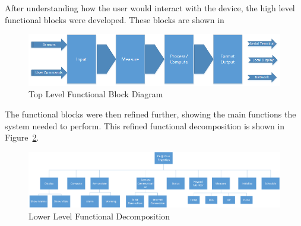 \documentclass[12pt]{article} %
\begin{document}
    After understanding how the user would interact with the device, the high level
    functional blocks were developed. These blocks are shown in


    \begin{figure}[h]
      \centering
      \includegraphics[width=\textwidth]{../design/top_level_function_block_diagram}
      \caption{Top Level Functional Block Diagram}
      \label{fig:func_top}
    \end{figure}

    The functional blocks were then refined further, showing the main functions
    the system needed to perform.  This refined functional decomposition is shown
    in Figure~\ref{fig:func_low}.

    \begin{figure}[h]
      \centering
      \includegraphics[width=\textwidth]{../design/Functional_decomposition}
      \caption{Lower Level Functional Decomposition}
      \label{fig:func_low}
    \end{figure}
\end{document}

